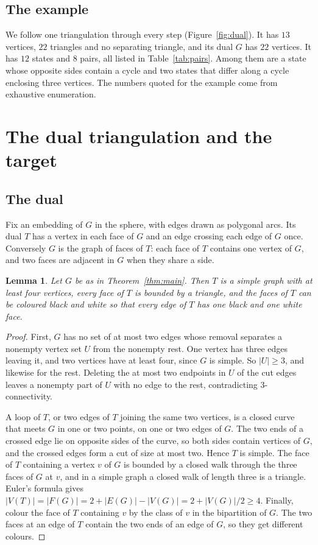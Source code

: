 \documentclass[10pt]{amsart}
\numberwithin{equation}{section}
\newtheorem{lemma}[equation]{Lemma}
\theoremstyle{definition}
\theoremstyle{remark}
\newcommand{\T}{T}
\begin{document}
\subsection*{The example}
We follow one triangulation through every step (Figure~\ref{fig:dual}).
It has $13$ vertices, $22$ triangles and no separating triangle, and its dual $G$ has $22$ vertices.
It has $12$ states and $8$ pairs, all listed in Table~\ref{tab:pairs}.
Among them are a state whose opposite sides contain a cycle and two states that differ along a cycle enclosing three vertices.
The numbers quoted for the example come from exhaustive enumeration.

\section{The dual triangulation and the target}\label{sec:picture}

\subsection*{The dual}
Fix an embedding of $G$ in the sphere, with edges drawn as polygonal arcs.
Its dual $\T$ has a vertex in each face of $G$ and an edge crossing each edge of $G$ once.
Conversely $G$ is the graph of faces of $\T$: each face of $\T$ contains one vertex of $G$, and two faces are adjacent in $G$ when they share a side.

\begin{lemma}\label{lem:dual}
Let $G$ be as in Theorem~\ref{thm:main}.
Then $\T$ is a simple graph with at least four vertices, every face of $\T$ is bounded by a triangle, and the faces of $\T$ can be coloured black and white so that every edge of $\T$ has one black and one white face.
\end{lemma}

\begin{proof}
First, $G$ has no set of at most two edges whose removal separates a nonempty vertex set $U$ from the nonempty rest.
One vertex has three edges leaving it, and two vertices have at least four, since $G$ is simple.
So $|U|\ge3$, and likewise for the rest.
Deleting the at most two endpoints in $U$ of the cut edges leaves a nonempty part of $U$ with no edge to the rest, contradicting $3$-connectivity.

A loop of $\T$, or two edges of $\T$ joining the same two vertices, is a closed curve that meets $G$ in one or two points, on one or two edges of $G$.
The two ends of a crossed edge lie on opposite sides of the curve, so both sides contain vertices of $G$, and the crossed edges form a cut of size at most two.
Hence $\T$ is simple.
The face of $\T$ containing a vertex $v$ of $G$ is bounded by a closed walk through the three faces of $G$ at $v$, and in a simple graph a closed walk of length three is a triangle.
Euler's formula gives $|V(\T)|=|F(G)|=2+|E(G)|-|V(G)|=2+|V(G)|/2\ge4$.
Finally, colour the face of $\T$ containing $v$ by the class of $v$ in the bipartition of $G$.
The two faces at an edge of $\T$ contain the two ends of an edge of $G$, so they get different colours.
\end{proof}
\end{document}

